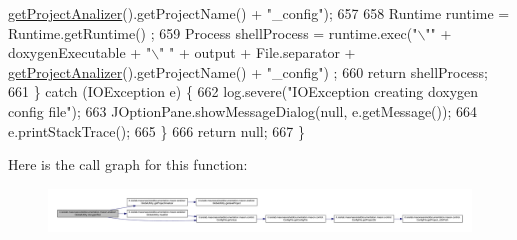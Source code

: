 \begin{DoxyCode}
      \hyperlink{classit_1_1isislab_1_1masonassisteddocumentation_1_1mason_1_1analizer_1_1_global_utility_a78cbdc6022c558d1375a01095ad95659}{getProjectAnalizer}().getProjectName() + \textcolor{stringliteral}{"\_config"});
657             
658             Runtime runtime = Runtime.getRuntime() ;
659             Process shellProcess = runtime.exec(\textcolor{stringliteral}{"\(\backslash\)""} + doxygenExecutable + \textcolor{stringliteral}{"\(\backslash\)" "} + output + File.separator 
      + \hyperlink{classit_1_1isislab_1_1masonassisteddocumentation_1_1mason_1_1analizer_1_1_global_utility_a78cbdc6022c558d1375a01095ad95659}{getProjectAnalizer}().getProjectName() + \textcolor{stringliteral}{"\_config"}) ;
660             \textcolor{keywordflow}{return} shellProcess;
661         \} \textcolor{keywordflow}{catch} (IOException e) \{
662             log.severe(\textcolor{stringliteral}{"IOException creating doxygen config file"});
663             JOptionPane.showMessageDialog(null, e.getMessage());
664             e.printStackTrace();
665         \}
666         \textcolor{keywordflow}{return} null;        
667     \}
\end{DoxyCode}


Here is the call graph for this function\-:
\nopagebreak
\begin{figure}[H]
\begin{center}
\leavevmode
\includegraphics[width=350pt]{classit_1_1isislab_1_1masonassisteddocumentation_1_1mason_1_1analizer_1_1_global_utility_a0b0db96cff45244361ff11e4e176b420_cgraph}
\end{center}
\end{figure}


